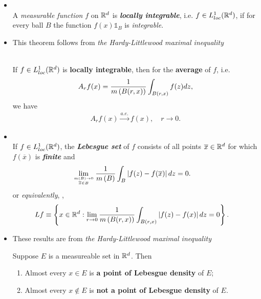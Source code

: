 \documentclass[11pt]{article}
\begin{document}
\begin{itemize}
\item \begin{definition}\citep{stein2009real}\\
A \emph{measurable function} $f$ on ${\mathbb R}^{d}$ is \emph{\textbf{locally integrable}}, i.e. $f\in L_{loc}^{1}({\mathbb R}^{d})$, if for every ball $B$ the function $f(x)\mathds{1}_{B}$ is \emph{integrable}. 
\end{definition}


\item This theorem follows from \emph{the Hardy-Littlewood maximal inequality}
\begin{theorem}  \citep{stein2009real}\\
If $f\in L_{loc}^{1}({\mathbb R}^{d})$ is \textbf{locally integrable}, then for the \textbf{average} of $f$, i.e. 
\begin{align*}
A_{r}f(x)&=\frac{1}{m\left(B(r,x)\right)}\int_{B(r,x)}f(z)dz,\\
\end{align*} we have
\begin{align*}
A_{r}f(x) \stackrel{a.e.}{\rightarrow} f(x), \quad r\rightarrow 0. 
\end{align*}
\end{theorem}

\item \begin{definition}\citep{stein2009real}\\
If $f\in L_{loc}^{1}({\mathbb R}^{d})$, the \emph{\textbf{Lebesgue set}} of $f$ consists of all points $\overline{x}\in {\mathbb R}^{d}$ for which $f(\overline{x})$ is \emph{\textbf{finite}} and 
\begin{align*}
\lim\limits_{m(B)\rightarrow 0\atop \overline{x}\in B}\frac{1}{m\left(B\right)}\int_{B}\left\lvert f(z)- f(\overline{x}) \right\rvert dz &= 0.
\end{align*}
or \emph{equivalently}, \citep{folland2013real},
\begin{align*}
Lf &\equiv\left\{x\in {\mathbb R}^{d}: \lim\limits_{r\rightarrow 0}\frac{1}{m\left(B(r,x)\right)}\int_{B(r,x)}\left\lvert f(z)- f(x) \right\rvert dz = 0\right\}.
\end{align*}
\end{definition}

\item These results are from \emph{the Hardy-Littlewood maximal inequality} 
\begin{corollary}
Suppose $E$ is a measureable set in ${\mathbb R}^{d}$. Then
\begin{enumerate}
\item Almost every $x\in E$ is \textbf{a point of Lebesgue density} of $E$;
\item Almost every $x\not\in E$ is \textbf{not a point of Lebesgue density} of $E$.
\end{enumerate}
\end{corollary}


\end{itemize}
\end{document}
